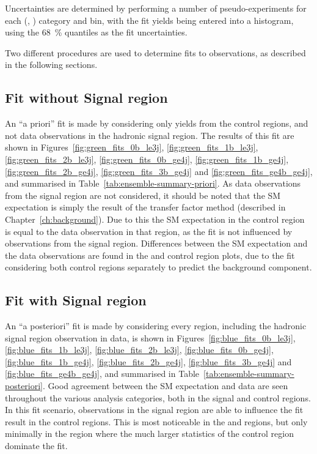 Uncertainties are determined by performing a number of pseudo-experiments for
each (\nb, \nj) category and \HT bin, with the fit yields being entered into a
histogram, using the 68~\% quantiles as the fit uncertainties.

Two different procedures are used to determine fits to observations, as described
in the following sections.

\subsection{Fit without Signal region}
\label{sec:results_fit_green}
An ``a priori'' fit is made by considering only yields from the control regions,
and not data observations in the hadronic signal region. The results of this fit
are shown in Figures~\ref{fig:green_fits_0b_le3j}, \ref{fig:green_fits_1b_le3j}, \ref{fig:green_fits_2b_le3j}, \ref{fig:green_fits_0b_ge4j}, \ref{fig:green_fits_1b_ge4j}, \ref{fig:green_fits_2b_ge4j}, \ref{fig:green_fits_3b_ge4j} and \ref{fig:green_fits_ge4b_ge4j},
and summarised in Table~\ref{tab:ensemble-summary-priori}. As data
observations from the signal region are not considered, it should be noted that
the SM expectation is simply the result of the transfer factor method
(described in Chapter~\ref{ch:background}). Due to this the SM expectation in
the \mj control region is equal to the data observation in
that region, as the fit is not influenced by observations from the signal region.
Differences between the SM expectation and the data observations are found in the
\mmj and \gj control region plots, due to the fit considering both control regions
separately to predict the \zinv background component.

\subsection{Fit with Signal region}
\label{sec:results_fit_blue}
An ``a posteriori'' fit is made by considering every region, including the
hadronic signal region observation in data, is shown in
Figures~\ref{fig:blue_fits_0b_le3j}, \ref{fig:blue_fits_1b_le3j}, \ref{fig:blue_fits_2b_le3j}, \ref{fig:blue_fits_0b_ge4j}, \ref{fig:blue_fits_1b_ge4j}, \ref{fig:blue_fits_2b_ge4j}, \ref{fig:blue_fits_3b_ge4j} and \ref{fig:blue_fits_ge4b_ge4j},
and summarised in Table~\ref{tab:ensemble-summary-posteriori}. Good agreement
between the SM expectation and data are seen throughout the various analysis
categories, both in the signal and control regions. In this fit scenario,
observations in the signal region are able to influence the
fit result in the control regions. This is most noticeable in the \mmj and \gj regions,
but only minimally in the \mj region where the much larger statistics of
the control region dominate the fit.

